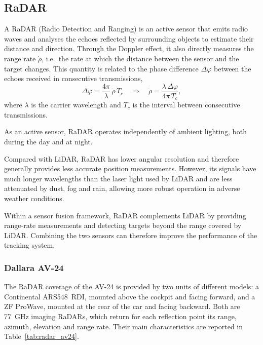 \subsection{RaDAR}
\label{subsec:radar}

A RaDAR (Radio Detection and Ranging) is an active sensor that emits radio waves and analyses
the echoes reflected by surrounding objects to estimate their distance and direction. Through
the Doppler effect, it also directly measures the range rate $\dot\rho$, i.e.\ the rate at which
the distance between the sensor and the target changes. This quantity is related to the phase
difference $\Delta\varphi$ between the echoes received in consecutive transmissions,
\begin{equation}
    \Delta\varphi = \frac{4\pi}{\lambda}\,\dot\rho\,T_c
    \quad\Longrightarrow\quad
    \dot\rho = \frac{\lambda\,\Delta\varphi}{4\pi\,T_c},
    \label{eq:doppler}
\end{equation}
where $\lambda$ is the carrier wavelength and $T_c$ is the interval between consecutive
transmissions.

As an active sensor, RaDAR operates independently of ambient lighting, both during the day and
at night.

Compared with LiDAR, RaDAR has lower angular resolution and therefore generally provides less
accurate position measurements. However, its signals have much longer wavelengths than the
laser light used by LiDAR and are less attenuated by dust, fog and rain, allowing more robust
operation in adverse weather conditions.

Within a sensor fusion framework, RaDAR complements LiDAR by providing range-rate measurements
and detecting targets beyond the range covered by LiDAR. Combining the two sensors can therefore improve the performance of the tracking system.

\subsubsection{Dallara AV-24}

The RaDAR coverage of the AV-24 is provided by two units of different models: a
Continental ARS548~RDI, mounted above the cockpit and facing forward, and a ZF ProWave,
mounted at the rear of the car and facing backward. Both are \SI{77}{GHz} imaging RaDARs,
which return for each reflection point its range, azimuth, elevation and range rate.
Their main characteristics are reported in Table~\ref{tab:radar_av24}.


